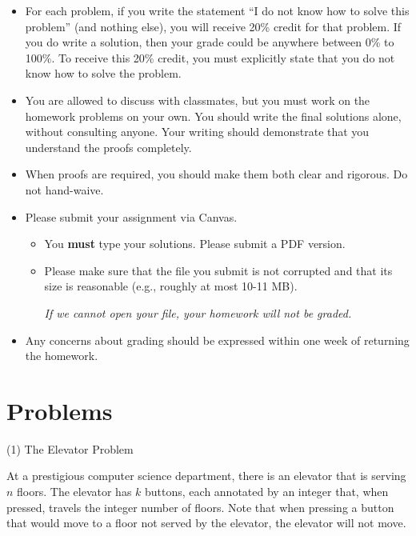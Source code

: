 \documentclass[11pt]{amsart}
\begin{document}
\begin{itemize}

\item %
For each problem, if you write  the statement ``I do not know how to solve this problem'' (and nothing else), you will receive 20\% credit for that problem. If you do write a solution, then your grade could be anywhere between 0\% to 100\%.
To receive this 20\% credit, you must explicitly state that you do not know how to solve the problem.

\item You are allowed to discuss with classmates, but you must work on the homework problems on your own.  You should write the final solutions alone, without consulting anyone. Your writing should demonstrate that you understand the proofs completely.

\item When proofs are required, you should make them both clear and rigorous. Do not hand-waive.

 \item Please submit your assignment via Canvas.
 \begin{itemize}
\item  You \textbf{must} type your solutions. Please submit a PDF version.
\item Please make sure that the file you submit is not corrupted and that its size is reasonable (e.g., roughly at most 10-11 MB).
\begin{center}
\emph{If we cannot open your file, your homework will not be graded.}
\end{center}
\end{itemize}

\item Any concerns about grading should be expressed within one week of
returning the homework. 
 
\end{itemize}


\section*{\large Problems}


(1) The Elevator Problem\medskip

At a prestigious computer science department, there is an elevator that is serving $n$ floors. The elevator has 
$k$ buttons, each annotated by an integer that, when pressed, travels the integer number of floors. Note that 
when pressing a button that would move to a floor not served by the elevator, the elevator will not move.\medskip
\end{document}
